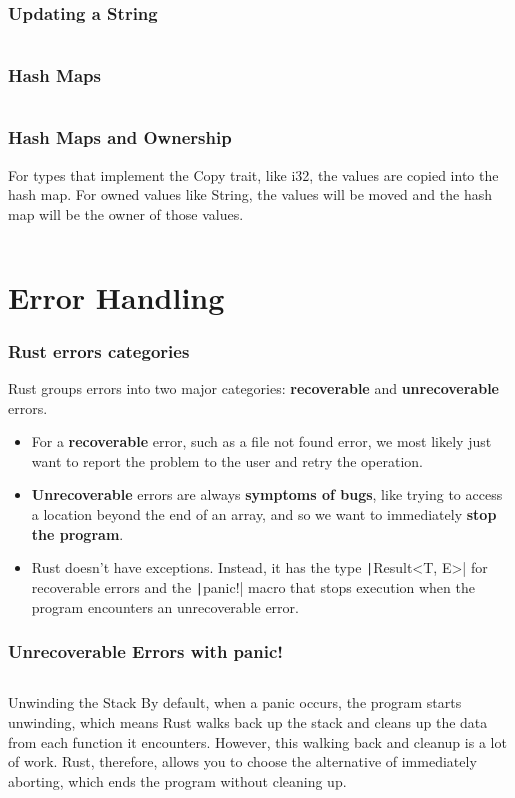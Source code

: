 \documentclass{beamer}
\begin{document}
\begin{frame}[fragile]
	\frametitle{Updating a String}
	\inputminted{rust}{./code/string_vec2.rs}
\end{frame}

\begin{frame}[fragile]
	\frametitle{Hash Maps}
	\inputminted{rust}{./code/map.rs}
\end{frame}


\begin{frame}[fragile]
	\frametitle{Hash Maps and Ownership}
	For types that implement the Copy trait, like i32, the values are copied into the hash map. For owned values like String, the values will be moved and the hash map will be the owner of those values.
	
	\inputminted{rust}{./code/map2.rs}
\end{frame}

\section{Error Handling}

\begin{frame}[fragile]
	\frametitle{Rust errors categories}
	Rust groups errors into two major categories: \textbf{recoverable} and \textbf{unrecoverable} errors. 
	\begin{itemize}
		\item For a \textbf{recoverable} error, such as a file not found error, we most likely just want to report the problem to the user and retry the operation. 
		\item 	\textbf{Unrecoverable} errors are always \textbf{symptoms of bugs}, like trying to access a location beyond the end of an array, and so we want to immediately \textbf{stop the program}.
		\item  Rust doesn’t have exceptions. Instead, it has the type \texttt|Result<T, E>| for recoverable errors and the  \texttt|panic!| macro that stops execution when the program encounters an unrecoverable error.
	\end{itemize}
	
\end{frame}

\begin{frame}[fragile]
	\frametitle{Unrecoverable Errors with panic!}
	\inputminted{rust}{./code/panic.rs}
	
	\begin{block}{Unwinding the Stack }
		By default, when a panic occurs, the program starts unwinding, which means Rust walks back up the stack and cleans up the data from each function it encounters. However, this walking back and cleanup is a lot of work. Rust, therefore, allows you to choose the alternative of immediately aborting, which ends the program without cleaning up.
	\end{block}
\end{frame}
\end{document}

